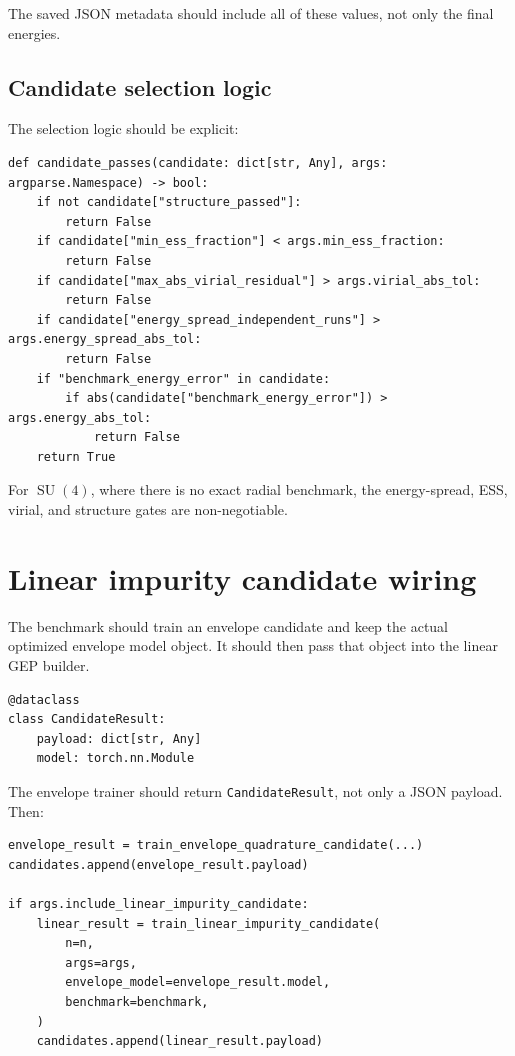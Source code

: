 \documentclass[11pt]{article}
\newcommand{\SU}{\operatorname{SU}}
\begin{document}
The saved JSON metadata should include all of these values, not only the final energies.

\subsection{Candidate selection logic}

The selection logic should be explicit:

\begin{lstlisting}[style=pythonstyle]
def candidate_passes(candidate: dict[str, Any], args: argparse.Namespace) -> bool:
    if not candidate["structure_passed"]:
        return False
    if candidate["min_ess_fraction"] < args.min_ess_fraction:
        return False
    if candidate["max_abs_virial_residual"] > args.virial_abs_tol:
        return False
    if candidate["energy_spread_independent_runs"] > args.energy_spread_abs_tol:
        return False
    if "benchmark_energy_error" in candidate:
        if abs(candidate["benchmark_energy_error"]) > args.energy_abs_tol:
            return False
    return True
\end{lstlisting}

For \(\SU(4)\), where there is no exact radial benchmark, the energy-spread, ESS, virial, and structure gates are non-negotiable.

\section{Linear impurity candidate wiring}

The benchmark should train an envelope candidate and keep the actual optimized envelope model object. It should then pass that object into the linear GEP builder.

\begin{lstlisting}[style=pythonstyle]
@dataclass
class CandidateResult:
    payload: dict[str, Any]
    model: torch.nn.Module
\end{lstlisting}

The envelope trainer should return \texttt{CandidateResult}, not only a JSON payload. Then:

\begin{lstlisting}[style=pythonstyle]
envelope_result = train_envelope_quadrature_candidate(...)
candidates.append(envelope_result.payload)

if args.include_linear_impurity_candidate:
    linear_result = train_linear_impurity_candidate(
        n=n,
        args=args,
        envelope_model=envelope_result.model,
        benchmark=benchmark,
    )
    candidates.append(linear_result.payload)
\end{lstlisting}
\end{document}
